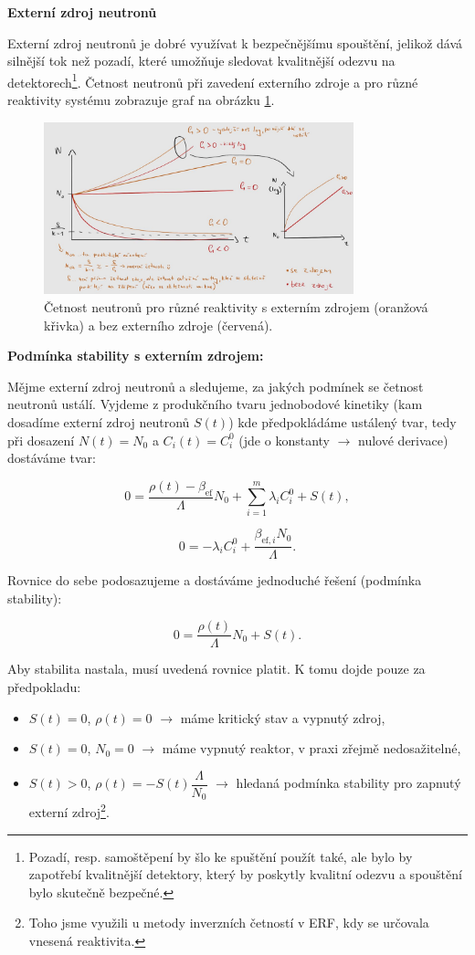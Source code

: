 \textbf{Externí zdroj neutronů}

Externí zdroj neutronů je dobré využívat k bezpečnějšímu spouštění, jelikož dává silnější tok než pozadí, které umožňuje sledovat kvalitnější odezvu na detektorech\footnote{Pozadí, resp. samoštěpení by šlo ke spuštění použít také, ale bylo by zapotřebí kvalitnější detektory, který by poskytly kvalitní odezvu a spouštění bylo skutečně bezpečné.}. Četnost neutronů při zavedení externího zdroje a pro různé reaktivity systému zobrazuje graf na obrázku \ref{fig_zdroj}.

\begin{figure}[H]
  \centering
  \includegraphics[width=0.8\textwidth]{img/zdroj.jpg}
  \caption{Četnost neutronů pro různé reaktivity s externím zdrojem (oranžová křivka) a bez externího zdroje (červená).}
  \label{fig_zdroj}
\end{figure}

\textbf{Podmínka stability s externím zdrojem:}

Mějme externí zdroj neutronů a sledujeme, za jakých podmínek se četnost neutronů ustálí. Vyjdeme z produkčního tvaru jednobodové kinetiky (kam dosadíme externí zdroj neutronů $S(t)$) kde předpokládáme ustálený tvar, tedy při dosazení $N(t) = N_0$ a $C_i(t) = C_i^0$ (jde o konstanty $\rightarrow$ nulové derivace) dostáváme tvar:

$$ 0 = \dfrac{\rho(t) - \beta_{\text{ef}}}{\Lambda} N_0 + \sum_{i=1}^m \lambda_i C_i^0 + S(t), $$

$$ 0 = -\lambda_i C_i^0 + \dfrac{\beta_{\text{ef},i}  N_0}{\Lambda}. $$

Rovnice do sebe podosazujeme a dostáváme jednoduché řešení (podmínka stability):

$$ 0 = \dfrac{\rho(t)}{\Lambda} N_0 + S(t). $$

Aby stabilita nastala, musí uvedená rovnice platit. K tomu dojde pouze za předpokladu:

\begin{itemize}
  \item $S(t) = 0$, $\rho(t) = 0$ $\rightarrow$ máme kritický stav a vypnutý zdroj,
  \item $S(t) = 0$, $N_0 = 0$ $\rightarrow$ máme vypnutý reaktor, v praxi zřejmě nedosažitelné,
  \item $S(t) > 0$, $\rho(t) = -S(t) \dfrac{\Lambda}{N_0}$ $\rightarrow$ hledaná podmínka stability pro zapnutý externí zdroj\footnote{Toho jsme využili u metody inverzních četností v ERF, kdy se určovala vnesená reaktivita.}.
\end{itemize}

